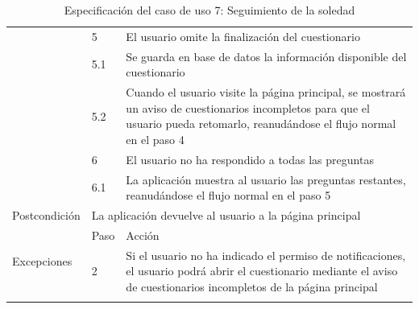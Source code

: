 \begin{table}[h]
\begin{tabularx}{\textwidth}{|l|l|X|}
            \cline{2-3} & 5 & El usuario omite la finalización del cuestionario \\
            \cline{2-3} & 5.1 & Se guarda en base de datos la información disponible del cuestionario \\
            \cline{2-3} & 5.2 & Cuando el usuario visite la página principal, se mostrará un aviso de cuestionarios incompletos para que el usuario pueda retomarlo, reanudándose el flujo normal en el paso 4 \\
            \cline{2-3} & 6 & El usuario no ha respondido a todas las preguntas \\
            \cline{2-3} & 6.1 & La aplicación muestra al usuario las preguntas restantes, reanudándose el flujo normal en el paso 5 \\
            \hline
            Postcondición & \multicolumn{2}{|X|}{La aplicación devuelve al usuario a la página principal} \\
            \hline
            \multirow{2}{*}{Excepciones}  & Paso & Acción \\
            \cline{2-3} & 2 & Si el usuario no ha indicado el permiso de notificaciones, el usuario podrá abrir el cuestionario mediante el aviso de cuestionarios incompletos de la página principal \\
            \hline
            \caption{Especificación del caso de uso 7: Seguimiento de la soledad}
            \label{tabla:casos_uso:seguimiento_soledad}
        \end{tabularx}
    \end{table}

